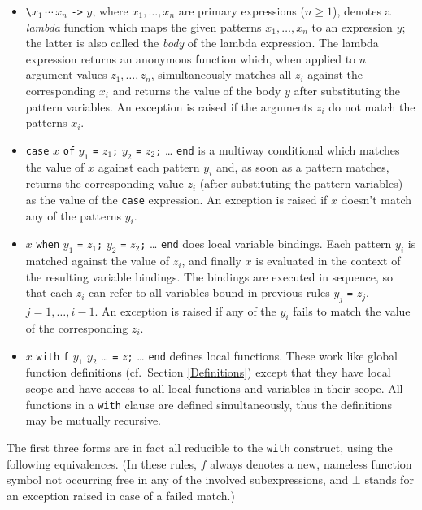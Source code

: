 \documentclass[a4paper,12pt]{article}
\begin{document}
\begin{itemize}
\item \verb|\|$x_1\,\cdots\,x_n$ \verb|->| $y$, where $x_1,\ldots,x_n$ are primary expressions ($n\geq 1$), denotes a \emph{lambda} function which maps the given patterns $x_1,\ldots,x_n$ to an expression $y$; the latter is also called the \emph{body} of the lambda expression. The lambda expression returns an anonymous function which, when applied to $n$ argument values $z_1,\ldots,z_n$, simultaneously matches all $z_i$ against the corresponding $x_i$ and returns the value of the body $y$ after substituting the pattern variables. An exception is raised if the arguments $z_i$ do not match the patterns $x_i$.
\item \lstinline{case} $x$ \lstinline{of} $y_1$ \verb|=| $z_1$\verb|;| $y_2$ \verb|=| $z_2$\verb|;| \ldots{} \lstinline{end} is a multiway conditional which matches the value of $x$ against each pattern $y_i$ and, as soon as a pattern matches, returns the corresponding value $z_i$ (after substituting the pattern variables) as the value of the \lstinline{case} expression. An exception is raised if $x$ doesn't match any of the patterns $y_i$.
\item $x$ \lstinline{when} $y_1$ \verb|=| $z_1$\verb|;| $y_2$ \verb|=| $z_2$\verb|;| \ldots{} \lstinline{end} does local variable bindings. Each pattern $y_i$ is matched against the value of $z_i$, and finally $x$ is evaluated in the context of the resulting variable bindings. The bindings are executed in sequence, so that each $z_i$ can refer to all variables bound in previous rules $y_j$ \verb|=| $z_j$, $j=1,\ldots,i-1$. An exception is raised if any of the $y_i$ fails to match the value of the corresponding $z_i$.
\item $x$ \lstinline{with} \verb|f| $y_1$ $y_2$ \ldots{} \verb|=| $z$\verb|;| \ldots{} \lstinline{end} defines local functions. These work like global function definitions (cf.\ Section \ref{Definitions}) except that they have local scope and have access to all local functions and variables in their scope. All functions in a \lstinline{with} clause are defined simultaneously, thus the definitions may be mutually recursive.
\end{itemize}

The first three forms are in fact all reducible to the \lstinline|with| construct, using the following equivalences. (In these rules, $f$ always denotes a new, nameless function symbol not occurring free in any of the involved subexpressions, and $\bot$ stands for an exception raised in case of a failed match.)
\end{document}

